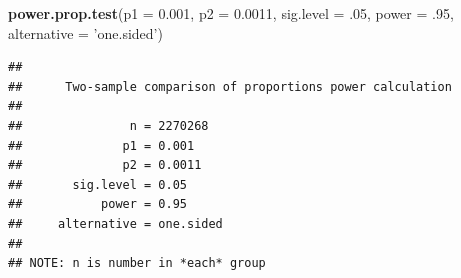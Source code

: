 \documentclass[landscape]{article}
\newenvironment{Shaded}{\begin{snugshade}}{\end{snugshade}}
\newcommand{\KeywordTok}[1]{\textcolor[rgb]{0.13,0.29,0.53}{\textbf{{#1}}}}
\newcommand{\DataTypeTok}[1]{\textcolor[rgb]{0.13,0.29,0.53}{{#1}}}
\newcommand{\DecValTok}[1]{\textcolor[rgb]{0.00,0.00,0.81}{{#1}}}
\newcommand{\FloatTok}[1]{\textcolor[rgb]{0.00,0.00,0.81}{{#1}}}
\newcommand{\StringTok}[1]{\textcolor[rgb]{0.31,0.60,0.02}{{#1}}}
\newcommand{\NormalTok}[1]{{#1}}
\begin{document}
\begin{Shaded}
\begin{Highlighting}[]
\KeywordTok{power.prop.test}\NormalTok{(}\DataTypeTok{p1 =} \FloatTok{0.001}\NormalTok{, }\DataTypeTok{p2 =} \FloatTok{0.0011}\NormalTok{, }
                \DataTypeTok{sig.level =} \NormalTok{.}\DecValTok{05}\NormalTok{, }\DataTypeTok{power =} \NormalTok{.}\DecValTok{95}\NormalTok{, }\DataTypeTok{alternative =} \StringTok{'one.sided'}\NormalTok{)}
\end{Highlighting}
\end{Shaded}

\begin{verbatim}
## 
##      Two-sample comparison of proportions power calculation 
## 
##               n = 2270268
##              p1 = 0.001
##              p2 = 0.0011
##       sig.level = 0.05
##           power = 0.95
##     alternative = one.sided
## 
## NOTE: n is number in *each* group
\end{verbatim}
\end{document}
